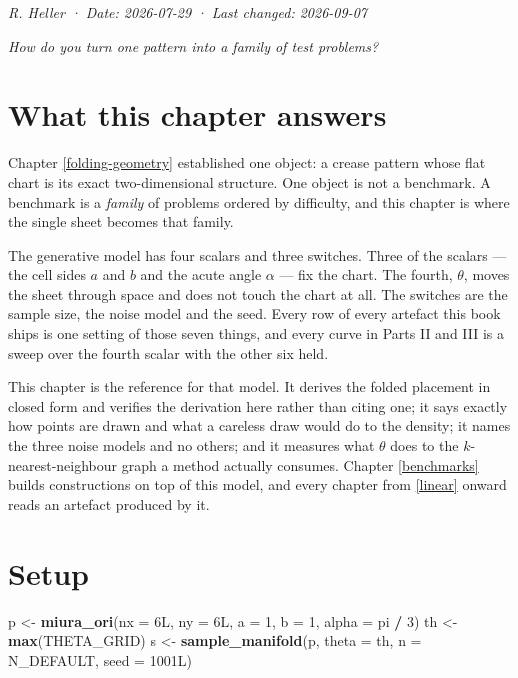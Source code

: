 \documentclass[
  british,
  a4paper,
]{book}
\newenvironment{Shaded}{\begin{snugshade}}{\end{snugshade}}
\newcommand{\AttributeTok}[1]{\textcolor[rgb]{0.13,0.29,0.53}{#1}}
\newcommand{\DataTypeTok}[1]{\textcolor[rgb]{0.13,0.29,0.53}{#1}}
\newcommand{\DecValTok}[1]{\textcolor[rgb]{0.00,0.00,0.81}{#1}}
\newcommand{\FunctionTok}[1]{\textcolor[rgb]{0.13,0.29,0.53}{\textbf{#1}}}
\newcommand{\NormalTok}[1]{#1}
\newcommand{\OtherTok}[1]{\textcolor[rgb]{0.56,0.35,0.01}{#1}}
\newcommand{\SpecialCharTok}[1]{\textcolor[rgb]{0.81,0.36,0.00}{\textbf{#1}}}
\begin{document}
\emph{R. Heller · Date: 2026-07-29 · Last changed: 2026-09-07}

\emph{How do you turn one pattern into a family of test problems?}

\section{What this chapter answers}\label{gen-question}

Chapter \ref{folding-geometry} established one object: a crease pattern whose
flat chart is its exact two-dimensional structure. One object is not a
benchmark. A benchmark is a \emph{family} of problems ordered by difficulty, and this
chapter is where the single sheet becomes that family.

The generative model has four scalars and three switches. Three of the scalars
--- the cell sides \(a\) and \(b\) and the acute angle \(\alpha\) --- fix the chart. The
fourth, \(\theta\), moves the sheet through space and does not touch the chart at
all. The switches are the sample size, the noise model and the seed. Every row
of every artefact this book ships is one setting of those seven things, and
every curve in Parts II and III is a sweep over the fourth scalar with the other
six held.

This chapter is the reference for that model. It derives the folded placement in
closed form and verifies the derivation here rather than citing one; it says
exactly how points are drawn and what a careless draw would do to the density;
it names the three noise models and no others; and it measures what \(\theta\)
does to the \(k\)-nearest-neighbour graph a method actually consumes. Chapter
\ref{benchmarks} builds constructions on top of this model, and every chapter
from \ref{linear} onward reads an artefact produced by it.

\section{Setup}\label{gen-setup}

\begin{Shaded}
\begin{Highlighting}[]
\NormalTok{p  }\OtherTok{\textless{}{-}} \FunctionTok{miura\_ori}\NormalTok{(}\AttributeTok{nx =} \DecValTok{6}\DataTypeTok{L}\NormalTok{, }\AttributeTok{ny =} \DecValTok{6}\DataTypeTok{L}\NormalTok{, }\AttributeTok{a =} \DecValTok{1}\NormalTok{, }\AttributeTok{b =} \DecValTok{1}\NormalTok{, }\AttributeTok{alpha =}\NormalTok{ pi }\SpecialCharTok{/} \DecValTok{3}\NormalTok{)}
\NormalTok{th }\OtherTok{\textless{}{-}} \FunctionTok{max}\NormalTok{(THETA\_GRID)}
\NormalTok{s  }\OtherTok{\textless{}{-}} \FunctionTok{sample\_manifold}\NormalTok{(p, }\AttributeTok{theta =}\NormalTok{ th, }\AttributeTok{n =}\NormalTok{ N\_DEFAULT, }\AttributeTok{seed =} \DecValTok{1001}\DataTypeTok{L}\NormalTok{)}
\end{Highlighting}
\end{Shaded}
\end{document}
